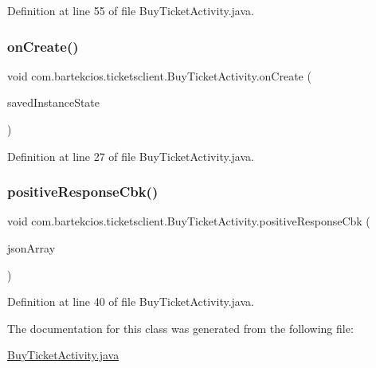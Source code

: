 Definition at line 55 of file Buy\+Ticket\+Activity.\+java.

\mbox{\label{classcom_1_1bartekcios_1_1ticketsclient_1_1_buy_ticket_activity_aae59e45725fb5840716e0ddcce2b88e3}} 
\subsubsection{\texorpdfstring{on\+Create()}{onCreate()}}
{\footnotesize\ttfamily void com.\+bartekcios.\+ticketsclient.\+Buy\+Ticket\+Activity.\+on\+Create (\begin{DoxyParamCaption}\item[{Bundle}]{saved\+Instance\+State }\end{DoxyParamCaption})\hspace{0.3cm}{\ttfamily [protected]}}



Definition at line 27 of file Buy\+Ticket\+Activity.\+java.

\mbox{\label{classcom_1_1bartekcios_1_1ticketsclient_1_1_buy_ticket_activity_a9b1bc6b8adc4010019ce154dab685ae3}} 
\subsubsection{\texorpdfstring{positive\+Response\+Cbk()}{positiveResponseCbk()}}
{\footnotesize\ttfamily void com.\+bartekcios.\+ticketsclient.\+Buy\+Ticket\+Activity.\+positive\+Response\+Cbk (\begin{DoxyParamCaption}\item[{J\+S\+O\+N\+Array}]{json\+Array }\end{DoxyParamCaption})}



Definition at line 40 of file Buy\+Ticket\+Activity.\+java.



The documentation for this class was generated from the following file\+:\begin{DoxyCompactItemize}
\item 
\hyperlink{_buy_ticket_activity_8java}{Buy\+Ticket\+Activity.\+java}\end{DoxyCompactItemize}
